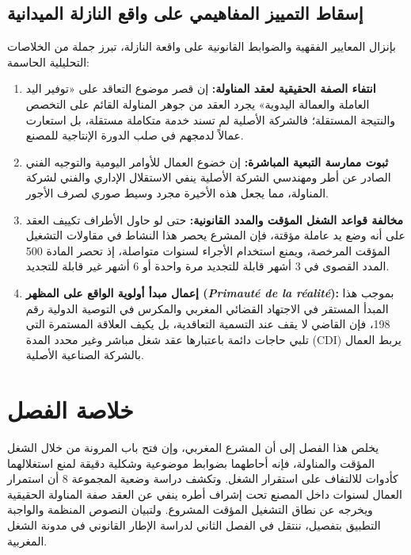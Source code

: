\subsection{إسقاط التمييز المفاهيمي على واقع النازلة الميدانية}
بإنزال المعايير الفقهية والضوابط القانونية على واقعة النازلة، تبرز جملة من الخلاصات التحليلية الحاسمة:
\begin{enumerate}[leftmargin=*, itemsep=5pt]
    \item \textbf{انتفاء الصفة الحقيقية لعقد المناولة:} إن قصر موضوع التعاقد على «توفير اليد العاملة والعمالة اليدوية» يجرد العقد من جوهر المناولة القائم على التخصص والنتيجة المستقلة؛ فالشركة الأصلية لم تسند خدمة متكاملة مستقلة، بل استعارت عمالاً لدمجهم في صلب الدورة الإنتاجية للمصنع.
    \item \textbf{ثبوت ممارسة التبعية المباشرة:} إن خضوع العمال للأوامر اليومية والتوجيه الفني الصادر عن أطر ومهندسي الشركة الأصلية ينفي الاستقلال الإداري والفني لشركة المناولة، مما يجعل هذه الأخيرة مجرد وسيط صوري لصرف الأجور.
    \item \textbf{مخالفة قواعد الشغل المؤقت والمدد القانونية:} حتى لو حاول الأطراف تكييف العقد على أنه وضع يد عاملة مؤقتة، فإن المشرع يحصر هذا النشاط في مقاولات التشغيل المؤقت المرخصة، ويمنع استخدام الأجراء لسنوات متواصلة، إذ تحصر المادة \textenglish{500} المدد القصوى في \textenglish{3} أشهر قابلة للتجديد مرة واحدة أو \textenglish{6} أشهر غير قابلة للتجديد.
    \item \textbf{إعمال مبدأ أولوية الواقع على المظهر (\textit{Primauté de la réalité}):} بموجب هذا المبدأ المستقر في الاجتهاد القضائي المغربي والمكرس في التوصية الدولية رقم \textenglish{198}، فإن القاضي لا يقف عند التسمية التعاقدية، بل يكيف العلاقة المستمرة التي تلبي حاجات دائمة باعتبارها عقد شغل مباشر وغير محدد المدة (\textenglish{CDI}) يربط العمال بالشركة الصناعية الأصلية.
\end{enumerate}

\section*{خلاصة الفصل}

يخلص هذا الفصل إلى أن المشرع المغربي، وإن فتح باب المرونة من خلال الشغل المؤقت والمناولة، فإنه أحاطهما بضوابط موضوعية وشكلية دقيقة لمنع استغلالهما كأدوات للالتفاف على استقرار الشغل. وتكشف دراسة وضعية المجموعة \textenglish{8} أن استمرار العمال لسنوات داخل المصنع تحت إشراف أطره ينفي عن العقد صفة المناولة الحقيقية ويخرجه عن نطاق التشغيل المؤقت المشروع. ولتبيان النصوص المنظمة والواجبة التطبيق بتفصيل، ننتقل في الفصل الثاني لدراسة الإطار القانوني في مدونة الشغل المغربية.

